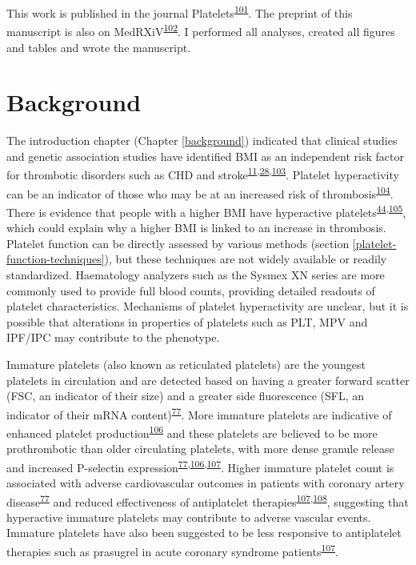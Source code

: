 \documentclass[11pt,twoside]{bristolthesis}
\begin{document}
This work is published in the journal Platelets\textsuperscript{\protect\hyperlink{ref-Goudswaard2022}{101}}. The preprint of this manuscript is also on MedRXiV\textsuperscript{\protect\hyperlink{ref-Goudswaard2021a}{102}}. I performed all analyses, created all figures and tables and wrote the manuscript.

\hypertarget{background-1}{%
\section{Background}\label{background-1}}

The introduction chapter (Chapter \ref{background}) indicated that clinical studies and genetic association studies have identified BMI as an independent risk factor for thrombotic disorders such as CHD and stroke\textsuperscript{\protect\hyperlink{ref-Nordestgaard2012}{11},\protect\hyperlink{ref-Dale2017}{28},\protect\hyperlink{ref-Wolk2003a}{103}}. Platelet hyperactivity can be an indicator of those who may be at an increased risk of thrombosis\textsuperscript{\protect\hyperlink{ref-Puurunen2018}{104}}. There is evidence that people with a higher BMI have hyperactive platelets\textsuperscript{\protect\hyperlink{ref-Nardin2015}{44},\protect\hyperlink{ref-Barrachina2019}{105}}, which could explain why a higher BMI is linked to an increase in thrombosis. Platelet function can be directly assessed by various methods (section \ref{platelet-function-techniques}), but these techniques are not widely available or readily standardized. Haematology analyzers such as the Sysmex XN series are more commonly used to provide full blood counts, providing detailed readouts of platelet characteristics. Mechanisms of platelet hyperactivity are unclear, but it is possible that alterations in properties of platelets such as PLT, MPV and IPF/IPC may contribute to the phenotype.

Immature platelets (also known as reticulated platelets) are the youngest platelets in circulation and are detected based on having a greater forward scatter (FSC, an indicator of their size) and a greater side fluorescence (SFL, an indicator of their mRNA content)\textsuperscript{\protect\hyperlink{ref-Ibrahim2014}{77}}. More immature platelets are indicative of enhanced platelet production\textsuperscript{\protect\hyperlink{ref-Lev2016a}{106}} and these platelets are believed to be more prothrombotic than older circulating platelets, with more dense granule release and increased P-selectin expression\textsuperscript{\protect\hyperlink{ref-Ibrahim2014}{77},\protect\hyperlink{ref-Lev2016a}{106},\protect\hyperlink{ref-Bernlochner2015a}{107}}. Higher immature platelet count is associated with adverse cardiovascular outcomes in patients with coronary artery disease\textsuperscript{\protect\hyperlink{ref-Ibrahim2014}{77}} and reduced effectiveness of antiplatelet therapies\textsuperscript{\protect\hyperlink{ref-Bernlochner2015a}{107},\protect\hyperlink{ref-Ibrahim2012}{108}}, suggesting that hyperactive immature platelets may contribute to adverse vascular events. Immature platelets have also been suggested to be less responsive to antiplatelet therapies such as prasugrel in acute coronary syndrome patients\textsuperscript{\protect\hyperlink{ref-Bernlochner2015a}{107}}.
\end{document}
